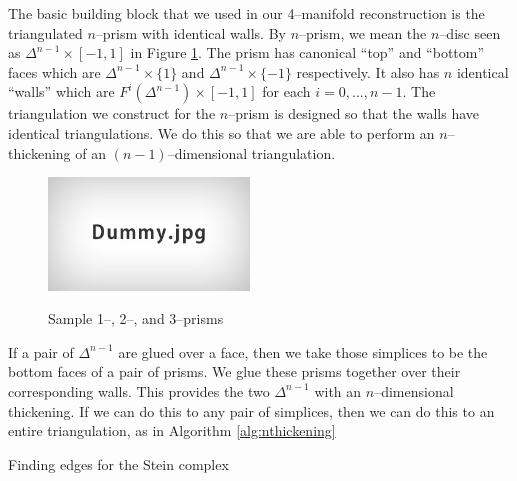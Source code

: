 The basic building block that we used in our 4--manifold reconstruction is the triangulated $n$--prism with identical walls.
By $n$--prism, we mean the $n$--disc seen as $\Delta^{n-1}\times [-1,1]$ in Figure \ref{fig:nprism}.
The prism has canonical ``top'' and ``bottom'' faces which are $\Delta^{n-1}\times \{1\}$ and $\Delta^{n-1}\times \{-1\}$ respectively.
It also has $n$ identical ``walls'' which are $F^i(\Delta^{n-1})\times [-1,1]$ for each $i=0,\dots,n-1$.
The triangulation we construct for the $n$--prism is designed so that the walls have identical triangulations.
We do this so that we are able to perform an $n$--thickening of an $(n-1)$--dimensional triangulation.

\begin{figure}
	\centering
	\captionsetup{justification=centering}
	\caption{Sample 1--, 2--, and 3--prisms}
	\includegraphics[height=3cm]{figures/dummy.jpg}
	\label{fig:nprism}
\end{figure}

If a pair of $\Delta^{n-1}$ are glued over a face, then we take those simplices to be the bottom faces of a pair of prisms.
We glue these prisms together over their corresponding walls.
This provides the two $\Delta^{n-1}$ with an $n$--dimensional thickening.
If we can do this to any pair of simplices, then we can do this to an entire triangulation, as in Algorithm \ref{alg:nthickening}

\begin{algorithm}[h]
	\caption{Finding edges for the Stein complex}
	\label{alg:steinedges}
\end{algorithm}

